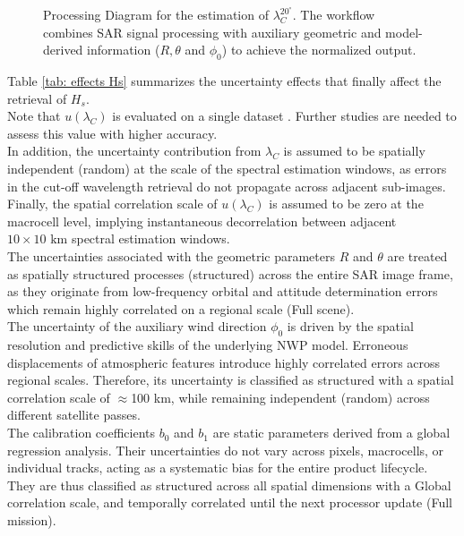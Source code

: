 \begin{figure}[htbp]
{
	}
	\caption{Processing Diagram for the estimation of $\lambda_{C}^{20^{\circ}}$. The workflow combines SAR signal processing with auxiliary geometric and model-derived information ($R, \theta$ and $\phi_0$) to achieve the normalized output.}
	\label{fig: proc_diag_lambda20}
\end{figure}

Table \ref{tab: effects Hs} summarizes the uncertainty effects that finally affect the retrieval of $H_{s}$. \\
Note that $u(\lambda_{C})$ is evaluated on a single dataset \cite{GriecoIJRS2016}. Further studies are needed to assess this value with higher accuracy. \\
In addition, the uncertainty contribution from \(\lambda _{C}\) is assumed to be spatially independent (random) at the scale of the spectral estimation windows, as errors in the cut-off wavelength retrieval do not propagate across adjacent sub-images. \\
Finally, the spatial correlation scale of \(u(\lambda_C)\) is assumed to be zero at the macrocell level, implying instantaneous decorrelation between adjacent \(10 \times 10\text{ km}\) spectral estimation windows.\\
The uncertainties associated with the geometric parameters \(R\) and \(\theta \) are treated as spatially structured processes (structured) across the entire SAR image frame, as they originate from low-frequency orbital and attitude determination errors which remain highly correlated on a regional scale (Full scene). \\
The uncertainty of the auxiliary wind direction $\phi_{0}$ is driven by the spatial resolution and predictive skills of the underlying NWP model. Erroneous displacements of atmospheric features introduce highly correlated errors across regional scales. Therefore, its uncertainty is classified as structured with a spatial correlation scale of $\approx$100 km, while remaining independent (random) across different satellite passes. \\
The calibration coefficients \(b_{0}\) and \(b_{1}\) are static parameters derived from a global regression analysis. Their uncertainties do not vary across pixels, macrocells, or individual tracks, acting as a systematic bias for the entire product lifecycle. They are thus classified as structured across all spatial dimensions with a Global correlation scale, and temporally correlated until the next processor update (Full mission).

